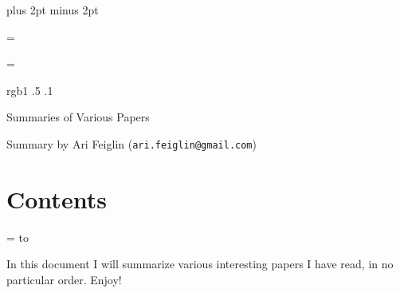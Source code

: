 

\parindent=0pt
\parskip=3pt plus 2pt minus 2pt



\footline={}


\headline={}

\color rgb{1 .5 .1}

{\def\boxshadowcolor{rgb{.8 .6 0}}

    \centerline{Summaries of Various Papers}
    \smallskip
    \centerline{Summary by Ari Feiglin ({\tt ari.feiglin@gmail.com})}

\eppbox

\bigskip

    \section*{Contents}
    
    \tableofcontents
\eppbox

}

\vfill\break

\color{black}

\newif\ifpageodd
\pageoddtrue
\headline={%
    \hbox to \hsize{\color{black}%
        \ifpageodd\hfil{\it\currsubsection\quad\bf\folio}\global\pageoddfalse%
        \else{\bf\folio\quad\it\currsubsection}\hfil\global\pageoddtrue\fi%
    }%
}

In this document I will summarize various interesting papers I have read, in no particular order.
Enjoy!



\bye


